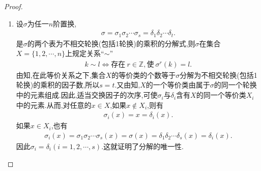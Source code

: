 \documentclass[../../main.tex]{subfiles}%
\begin{document}
\begin{proof}
\begin{enumerate}[(1)]
\begin{enumerate}[(i)]
如果$j \sim k$, $k \sim l$,则存在$r_1,r_2 \in \mathbb{Z}$,使$\sigma^{r_1}(j) = k$, $\sigma^{r_2}(k) = l$,于是$\sigma^{r_1+r_2}(j) = l$,从而$j \sim l$,这说明$\sim$具有传递性.

这就证明了$\sim$是$X$的一个等价关系.

\item {\heiti 必要性:} 设$k \sim l$,则存在$r \in \mathbb{Z}$,使$\sigma^r(k) = l$.设$k$属于轮换$\sigma_i$,则
\begin{align*}
l = \sigma^r(k) = (\sigma_1\sigma_2\cdots\sigma_s)^r(k) 
= \sigma_1^r\sigma_2^r\cdots\sigma_s^r(k) 
= \sigma_i^r(k),
\end{align*}
即$l$也属于轮换$\sigma_i$,从而$k$与$l$属于$\sigma$的同一个轮换.

{\heiti 充分性:} 如果$k$与$l$属于$\sigma$的同一个轮换$\sigma_i$,则必有$r \in \mathbb{Z}$,使$\sigma_i^r(k) = l$,从而
\begin{align*}
l = \sigma_i^r(k) = \sigma_1^r\sigma_2^r\cdots\sigma_s^r(k) 
= (\sigma_1\sigma_2\cdots\sigma_s)^r(k) 
= \sigma^r(k),
\end{align*}
所以$k \sim l$.
\end{enumerate}

\item 设$\sigma$为任一$n$阶置换,
\begin{align*}
\sigma = \sigma_1\sigma_2\cdots\sigma_s 
= \delta_1\delta_2\cdots\delta_t.
\end{align*}
是$\sigma$的两个表为不相交轮换(包括1轮换)的乘积的分解式,则$\sigma$在集合$X = \{1,2,\cdots,n\}$上规定关系“$\sim$”
\begin{align*}
k \sim l \iff 存在\ r \in \mathbb{Z}, 使\ \sigma^r(k) = l.
\end{align*}
由知,在此等价关系之下,集合$X$的等价类的个数等于$\sigma$分解为不相交轮换(包括1轮换)的乘积的因子数,所以$s = t$.又由知,$X$的一个等价类由属于$\sigma$的同一个轮换中的元素组成.因此,适当交换因子的次序,可使$\sigma_i$与$\delta_i$含有$X$的同一个等价类$X_i$中的元素.从而,对任意的$x \in X$,如果$x \notin X_i$,则有
\begin{align*}
\sigma_i(x) = x = \delta_i(x).
\end{align*}
如果$x \in X_i$,也有
\begin{align*}
\sigma_i(x) = \sigma_1\sigma_2\cdots\sigma_s(x) 
= \sigma(x) 
= \delta_1\delta_2\cdots\delta_s(x) 
= \delta_i(x).
\end{align*}
因此$\sigma_i = \delta_i(i = 1,2,\cdots,s)$.这就证明了分解的唯一性.
\end{enumerate}
\end{proof}
\end{document}
